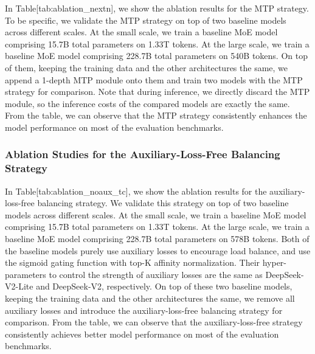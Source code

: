 \documentclass[11pt,a4paper]{article}
\begin{document}
In Table[tab:ablation\_nextn], we show the ablation results for the MTP strategy. 
To be specific, we validate the MTP strategy on top of two baseline models across different scales. 
At the small scale, we train a baseline MoE model comprising 15.7B total parameters on 1.33T tokens. 
At the large scale, we train a baseline MoE model comprising 228.7B total parameters on 540B tokens. 
On top of them, keeping the training data and the other architectures the same, we append a 1-depth MTP module onto them and train two models with the MTP strategy for comparison. 
Note that during inference, we directly discard the MTP module, so the inference costs of the compared models are exactly the same. 
From the table, we can observe that the MTP strategy consistently enhances the model performance on most of the evaluation benchmarks.

\subsubsection{Ablation Studies for the Auxiliary-Loss-Free Balancing Strategy}

In Table[tab:ablation\_noaux\_tc], we show the ablation results for the auxiliary-loss-free balancing strategy.
We validate this strategy on top of two baseline models across different scales. 
At the small scale, we train a baseline MoE model comprising 15.7B total parameters on 1.33T tokens. 
At the large scale, we train a baseline MoE model comprising 228.7B total parameters on 578B tokens. 
Both of the baseline models purely use auxiliary losses to encourage load balance, and use the sigmoid gating function with top-K affinity normalization. 
Their hyper-parameters to control the strength of auxiliary losses are the same as DeepSeek-V2-Lite and DeepSeek-V2, respectively. 
On top of these two baseline models, keeping the training data and the other architectures the same, we remove all auxiliary losses and introduce the auxiliary-loss-free balancing strategy for comparison. 
From the table, we can observe that the auxiliary-loss-free strategy consistently achieves better model performance on most of the evaluation benchmarks.
\end{document}
